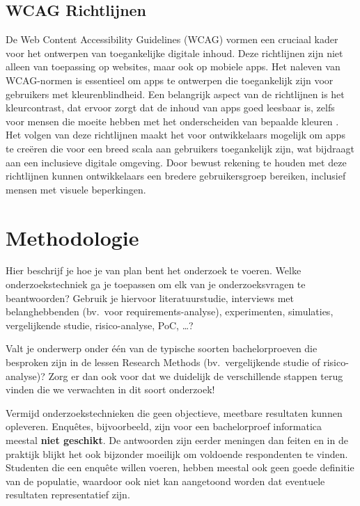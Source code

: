 \subsection{WCAG Richtlijnen}
De Web Content Accessibility Guidelines (WCAG) vormen een cruciaal kader voor het ontwerpen 
van toegankelijke digitale inhoud. Deze richtlijnen zijn niet alleen van toepassing op websites, 
maar ook op mobiele apps. Het naleven van WCAG-normen is essentieel om apps te ontwerpen die 
toegankelijk zijn voor gebruikers met kleurenblindheid. Een belangrijk aspect van de richtlijnen is 
het kleurcontrast, dat ervoor zorgt dat de inhoud van apps goed leesbaar is, zelfs voor mensen die 
moeite hebben met het onderscheiden van bepaalde kleuren \autocite{Lindahl2023}. Het volgen van deze 
richtlijnen maakt het voor ontwikkelaars mogelijk om apps te creëren die voor een breed scala aan 
gebruikers toegankelijk zijn, wat bijdraagt aan een inclusieve digitale omgeving. Door bewust 
rekening te houden met deze richtlijnen kunnen ontwikkelaars een bredere gebruikersgroep bereiken, 
inclusief mensen met visuele beperkingen.



\section{Methodologie}%
\label{sec:methodologie}

Hier beschrijf je hoe je van plan bent het onderzoek te voeren. Welke onderzoekstechniek ga je toepassen om elk van je onderzoeksvragen te beantwoorden? Gebruik je hiervoor literatuurstudie, interviews met belanghebbenden (bv.~voor requirements-analyse), experimenten, simulaties, vergelijkende studie, risico-analyse, PoC, \ldots?

Valt je onderwerp onder één van de typische soorten bachelorproeven die besproken zijn in de lessen Research Methods (bv.\ vergelijkende studie of risico-analyse)? Zorg er dan ook voor dat we duidelijk de verschillende stappen terug vinden die we verwachten in dit soort onderzoek!

Vermijd onderzoekstechnieken die geen objectieve, meetbare resultaten kunnen opleveren. Enquêtes, bijvoorbeeld, zijn voor een bachelorproef informatica meestal \textbf{niet geschikt}. De antwoorden zijn eerder meningen dan feiten en in de praktijk blijkt het ook bijzonder moeilijk om voldoende respondenten te vinden. Studenten die een enquête willen voeren, hebben meestal ook geen goede definitie van de populatie, waardoor ook niet kan aangetoond worden dat eventuele resultaten representatief zijn.

